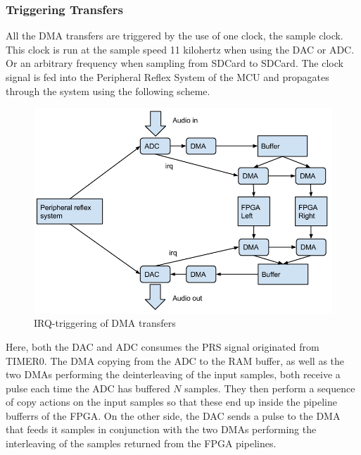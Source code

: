 \subsubsection{Triggering Transfers}

All the DMA transfers are triggered by the use of one clock, the sample clock.
This clock is run at the sample speed 11 kilohertz when using the DAC or ADC. Or
an arbitrary frequency when sampling from SDCard to SDCard. The clock signal is fed into
the Peripheral Reflex System \cite{prs} of the MCU and propagates
through the system using the following scheme.

\begin{figure}[H]
    \centering
    \includegraphics[width=1\textwidth]{figures/sw/dma-paths.png}
    \caption{IRQ-triggering of DMA transfers}
    \label{fig:software-stack}
\end{figure}

Here, both the DAC and ADC consumes the PRS signal originated from TIMER0. The
DMA copying from the ADC to the RAM buffer, as well as the two DMAs performing the
deinterleaving of the input samples, both receive a pulse each time the ADC has
buffered $N$ samples. They then perform a sequence of copy actions on the input
samples so that these end up inside the pipeline bufferrs of the FPGA. On the
other side, the DAC sends a pulse to the DMA that feeds it samples in conjunction
with the two DMAs performing the interleaving of the samples returned from the
FPGA pipelines.
